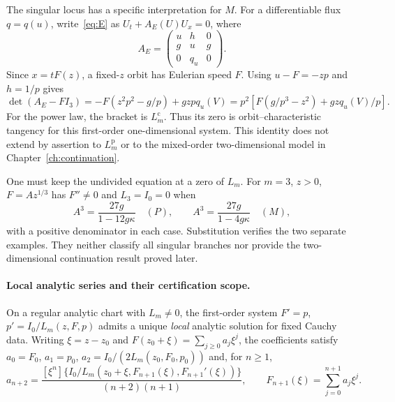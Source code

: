 \documentclass[12pt,a4paper,oneside]{report}
\numberwithin{equation}{chapter}
\theoremstyle{remark}\newtheorem{remark}[theorem]{Remark}
\begin{document}
The singular locus has a specific interpretation for $M$. For a differentiable
flux $q=q(u)$, write~\eqref{eq:E} as $U_t+A_E(U)U_x=0$, where
\begin{equation}
 A_E=\begin{pmatrix}u&h&0\\g&u&g\\0&q_u&0\end{pmatrix}.
\end{equation}
Since $x=tF(z)$, a fixed-$z$ orbit has Eulerian speed $F$. Using $u-F=-zp$
and $h=1/p$ gives
\begin{equation}\label{eq:determinant}
 \det(A_E-FI_3)=-F(z^2p^2-g/p)+gzpq_u(V)
 =p^2\left[F(g/p^3-z^2)+gzq_u(V)/p\right].
\end{equation}
For the power law, the bracket is $L_m^{\mathrm c}$. Thus its zero is
orbit--characteristic tangency for this first-order one-dimensional system.
This identity does not extend by assertion to $L_m^{\mathrm p}$ or to the
mixed-order two-dimensional model in Chapter~\ref{ch:continuation}.

One must keep the undivided equation at a zero of $L_m$. For $m=3$, $z>0$,
$F=Az^{1/3}$ has $F''\ne0$ and $L_3=I_0=0$ when
\begin{equation}\label{eq:singular-scalar}
 A^3=\frac{27g}{1-12g\kappa}\quad(P),\qquad
 A^3=\frac{27g}{1-4g\kappa}\quad(M),
\end{equation}
with a positive denominator in each case. Substitution verifies the two
separate examples. They neither classify all singular branches nor provide
the two-dimensional continuation result proved later.

\paragraph{Local analytic series and their certification scope.}
On a regular analytic chart with $L_m\ne0$, the first-order system
$F'=p$, $p'=I_0/L_m(z,F,p)$ admits a unique \emph{local} analytic solution
for fixed Cauchy data. Writing $\xi=z-z_0$ and
$F(z_0+\xi)=\sum_{j\ge0}a_j\xi^j$, the coefficients satisfy
$a_0=F_0$, $a_1=p_0$, $a_2=I_0/(2L_m(z_0,F_0,p_0))$ and, for $n\ge1$,
\begin{equation}\label{eq:analytic-series-rec}
 a_{n+2}=
 \frac{[\xi^n]\{I_0/L_m(z_0+\xi,F_{n+1}(\xi),F_{n+1}'(\xi))\}}
 {(n+2)(n+1)},\qquad
 F_{n+1}(\xi)=\sum_{j=0}^{n+1}a_j\xi^j.
\end{equation}
\end{document}
